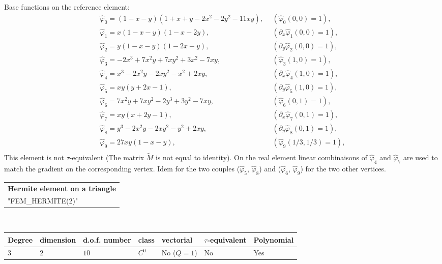 \documentclass[10pt,a4paper]{article}
\begin{document}
Base functions on the reference element:
$$
\begin{array}{ll}
  \hat{\varphi}_0 = (1-x-y)(1+x+y-2x^2-2y^2-11xy),~~ & (\hat{\varphi}_0(0,0) = 1), \\
  \hat{\varphi}_1 = x(1-x-y)(1-x-2y), & (\partial_x\hat{\varphi}_1(0,0) = 1), \\
  \hat{\varphi}_2 = y(1-x-y)(1-2x-y), & (\partial_y\hat{\varphi}_2(0,0) = 1), \\
  \hat{\varphi}_3 = -2x^3 + 7 x^2y + 7xy^2 + 3x^2 - 7xy, & (\hat{\varphi}_3(1,0) = 1), \\
  \hat{\varphi}_4 = x^3-2x^2y-2xy^2-x^2+2xy, & (\partial_x\hat{\varphi}_4(1,0) = 1), \\
  \hat{\varphi}_5 = xy(y+2x-1), & (\partial_y\hat{\varphi}_5(1,0) = 1), \\
  \hat{\varphi}_6 = 7x^2y + 7xy^2 - 2y^3+3y^2-7xy, & (\hat{\varphi}_6(0,1) = 1), \\
  \hat{\varphi}_7 = xy(x+2y-1), & (\partial_x\hat{\varphi}_7(0,1) = 1), \\
  \hat{\varphi}_8 = y^3-2x^2y-2xy^2-y^2+2xy, & (\partial_y\hat{\varphi}_8(0,1) = 1), \\
  \hat{\varphi}_9 = 27xy(1-x-y), & (\hat{\varphi}_9(1/3,1/3) = 1), \\
\end{array}
$$
This element is not \mbox{$\tau$-equivalent} (The matrix $\tilde{M}$ is not equal to identity). On the real element linear combinaisons of $\hat{\varphi}_4$ and $\hat{\varphi}_7$ are used to match the gradient on the corresponding vertex. Idem for the two couples ($\hat{\varphi}_5$, $\hat{\varphi}_8$) and  ($\hat{\varphi}_6$, $\hat{\varphi}_9$) for the two other vertices.  

\begin{center}
\begin{tabular}{|m{16.11cm}|} \hline 
{ \bf Hermite element on a triangle}\\
"FEM\_HERMITE(2)"
\end{tabular} \\ \vspace{-1pt} 
\begin{tabular}{|m{2cm}|m{2cm}|m{2.5cm}|m{1.2cm}|m{2cm}|m{2cm}|m{1.8cm}|} \hline 
Degree & dimension & d.o.f. number & class & vectorial & \mbox{$\tau$-equivalent} & Polynomial\\ \hline
$3$ & $2$ & $10$ & $C^0$ & No \mbox{($Q = 1$)} & No & Yes\\ \hline
\end{tabular}
\end{center}
\end{document}
